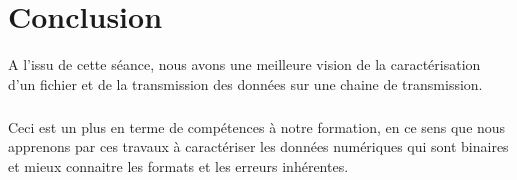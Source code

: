 \chapter*{Conclusion}
\minitoc


A l'issu de cette séance, nous avons une meilleure vision de la caractérisation d'un fichier et de la transmission des données sur une chaine de transmission.
\paragraph{}
Ceci est un plus en terme de compétences à notre formation, en ce sens que nous apprenons par ces travaux à caractériser les données numériques qui sont binaires et mieux connaitre les formats et les erreurs inhérentes.

